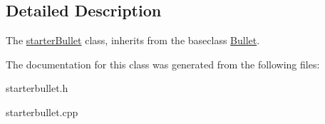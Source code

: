 \subsection{Detailed Description}
The \hyperlink{classstarterBullet}{starter\+Bullet} class, inherits from the baseclass \hyperlink{classBullet}{Bullet}. 

The documentation for this class was generated from the following files\+:\begin{DoxyCompactItemize}
\item 
starterbullet.\+h\item 
starterbullet.\+cpp\end{DoxyCompactItemize}
